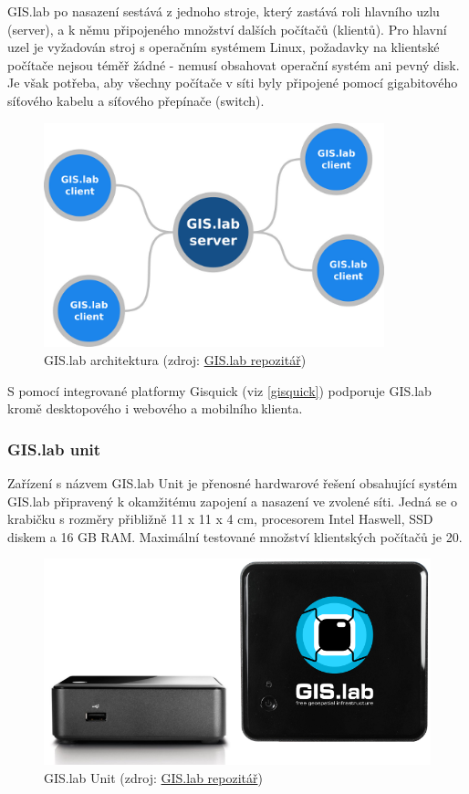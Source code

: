 GIS.lab po nasazení sestává z jednoho stroje, který zastává roli hlavního uzlu (server), a k němu připojeného množství dalších počítačů (klientů). Pro hlavní uzel je vyžadován stroj s operačním systémem Linux, požadavky na klientské počítače nejsou téměř žádné - nemusí obsahovat operační systém ani pevný disk. Je však potřeba, aby všechny počítače v síti byly připojené pomocí gigabitového síťového kabelu a síťového přepínače (switch).

\begin{figure}[H] \centering
    \includegraphics[width=280pt]{./pictures/gislab-architecture.png}
    \caption[GIS.lab architektura]{GIS.lab architektura (zdroj:
	\href{https://github.com/gislab-npo/gislab-doc/blob/master/img/general/gislab-architecture.png}{GIS.lab repozitář})}
	\label{fig:gislab-architecture}
\end{figure}

S pomocí integrované platformy Gisquick (viz \ref{gisquick}) podporuje GIS.lab kromě desktopového i webového a mobilního klienta. 

\subsubsection{GIS.lab unit}
\label{gislab-unit}
Zařízení s názvem GIS.lab Unit je přenosné hardwarové řešení obsahující systém GIS.lab připravený k okamžitému zapojení a nasazení ve zvolené síti. Jedná se o krabičku s rozměry přibližně 11 x 11 x 4 cm, procesorem Intel Haswell, SSD diskem a 16 GB RAM. Maximální testované množství klientských počítačů je 20.

\begin{figure}[H] \centering
    \includegraphics[width=350pt]{./pictures/gislab-unit.png}
    \caption[GIS.lab Unit]{GIS.lab Unit (zdroj:
	\href{https://github.com/gislab-npo/gislab-doc/blob/master/img/general/gislab-unit.svg}{GIS.lab repozitář})}
    \label{fig:gislab-unit}
\end{figure}


